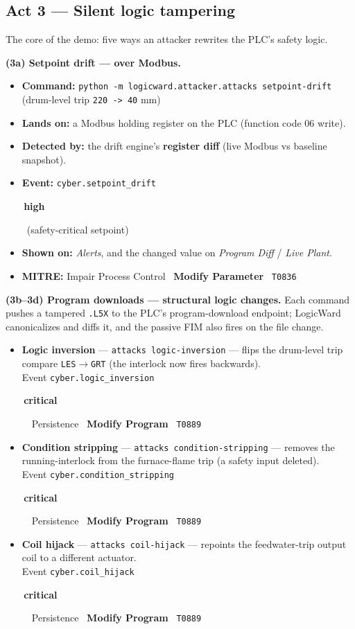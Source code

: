 \documentclass[11pt,a4paper]{article}
\newcommand{\code}[1]{\texttt{\small #1}}
\newcommand{\sev}[2]{\colorbox{#1}{\small\strut\,#2\,}}
\newcommand{\crit}{\sev{critbg}{\color{critical}\textbf{critical}}}
\newcommand{\high}{\sev{highbg}{\color{serious}\textbf{high}}}
\begin{document}
\subsection{Act 3 --- Silent logic tampering}
The core of the demo: five ways an attacker rewrites the PLC's safety logic.

\textbf{(3a) Setpoint drift --- over Modbus.}
\begin{itemize}[leftmargin=1.3em,itemsep=1pt]
  \item \textbf{Command:} \code{python -m logicward.attacker.attacks setpoint-drift} \quad(drum-level trip \code{220 -> 40} mm)
  \item \textbf{Lands on:} a Modbus holding register on the PLC (function code 06 write).
  \item \textbf{Detected by:} the drift engine's \textbf{register diff} (live Modbus vs baseline snapshot).
  \item \textbf{Event:} \code{cyber.setpoint\_drift} \quad\high\ (safety-critical setpoint)
  \item \textbf{Shown on:} \emph{Alerts}, and the changed value on \emph{Program Diff} / \emph{Live Plant}.
  \item \textbf{MITRE:} Impair Process Control \textbullet\ \textbf{Modify Parameter} \textbullet\ \code{T0836}
\end{itemize}

\textbf{(3b--3d) Program downloads --- structural logic changes.} Each command pushes a
tampered \code{.L5X} to the PLC's program-download endpoint; LogicWard canonicalizes and
diffs it, and the passive FIM also fires on the file change.
\begin{itemize}[leftmargin=1.3em,itemsep=2pt]
  \item \textbf{Logic inversion} --- \code{attacks logic-inversion} --- flips the drum-level
        trip compare \code{LES$\rightarrow$GRT} (the interlock now fires backwards).\\
        Event \code{cyber.logic\_inversion} \crit\ \textbullet\ Persistence \textbullet\ \textbf{Modify Program} \textbullet\ \code{T0889}
  \item \textbf{Condition stripping} --- \code{attacks condition-stripping} --- removes the
        running-interlock from the furnace-flame trip (a safety input deleted).\\
        Event \code{cyber.condition\_stripping} \crit\ \textbullet\ Persistence \textbullet\ \textbf{Modify Program} \textbullet\ \code{T0889}
  \item \textbf{Coil hijack} --- \code{attacks coil-hijack} --- repoints the feedwater-trip
        output coil to a different actuator.\\
        Event \code{cyber.coil\_hijack} \crit\ \textbullet\ Persistence \textbullet\ \textbf{Modify Program} \textbullet\ \code{T0889}
\end{itemize}
\end{document}
